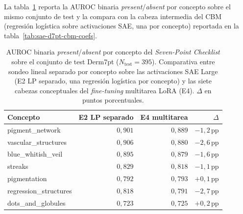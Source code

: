 La tabla~\ref{tab:sae-d7pt-e4-concepts} reporta la AUROC binaria
\emph{present}/\emph{absent} por concepto sobre el mismo conjunto
de test y la compara con la cabeza intermedia del CBM (regresión
logística sobre activaciones SAE, una por concepto) reportada en
la tabla~\ref{tab:sae-d7pt-cbm-coefs}.

\begin{table}[H]
\centering
\footnotesize
\setlength{\tabcolsep}{4pt}
\renewcommand{\arraystretch}{0.95}
\caption{AUROC binaria \emph{present}/\emph{absent} por concepto
del \emph{Seven-Point Checklist} sobre el conjunto de test
Derm7pt ($N_{\mathrm{test}} = 395$). Comparativa entre sondeo
lineal separado por concepto sobre las activaciones SAE Large
(E2 LP separado, una regresión logística por concepto) y las
siete cabezas conceptuales del \emph{fine-tuning} multitarea
LoRA (E4). $\Delta$ en puntos porcentuales.}
\label{tab:sae-d7pt-e4-concepts}
\begin{tabular}{lrrr}
\hline
Concepto                & E2 LP separado & E4 multitarea & $\Delta$ \\
\hline
pigment\_network        & $0{,}901$ & $0{,}889$ & $-1{,}2$\,pp \\
vascular\_structures    & $0{,}906$ & $0{,}880$ & $-2{,}6$\,pp \\
blue\_whitish\_veil     & $0{,}895$ & $0{,}879$ & $-1{,}6$\,pp \\
streaks                 & $0{,}829$ & $0{,}818$ & $-1{,}1$\,pp \\
pigmentation            & $0{,}792$ & $0{,}793$ & $+0{,}1$\,pp \\
regression\_structures  & $0{,}818$ & $0{,}791$ & $-2{,}7$\,pp \\
dots\_and\_globules     & $0{,}723$ & $0{,}725$ & $+0{,}2$\,pp \\
\hline
\end{tabular}
\end{table}

